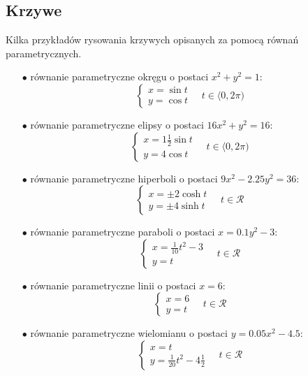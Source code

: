 \documentclass[a4paper,titlepage,12pt]{mwart}
\numberwithin{equation}{section}	%
\numberwithin{table}{section}           %
\numberwithin{figure}{section}          %
\begin{document}
\subsection{Krzywe}
Kilka przykładów rysowania krzywych opisanych za pomocą równań parametrycznych.
\begin{itemize}
\item[$\bullet$] równanie parametryczne okręgu o postaci $x^2+y^2=1$:
\begin{equation*} 
\begin{cases}
x=\sin t \\
y=\cos t 
\end{cases}
\quad t\in \langle 0, 2\pi )
\end{equation*}
\item[$\bullet$] równanie parametryczne elipsy o postaci $16x^2+y^2=16$:
\begin{equation*} 
\begin{cases}
x=1\frac{1}{2}\sin t \\
y=4\cos t 
\end{cases}
\quad t\in \langle 0, 2\pi )
\end{equation*}
\item[$\bullet$] równanie parametryczne hiperboli o postaci $9x^2-2.25y^2=36$:
\begin{equation*}
\begin{cases}
x=\pm2\cosh t \\
y=\pm4\sinh t 
\end{cases}
\quad t\in \mathcal{R}
\end{equation*}
\item[$\bullet$] równanie parametryczne paraboli o postaci $x=0.1y^2-3$:
\begin{equation*}
\begin{cases}
x= \frac{1}{10}t^2-3\\
y= t 
\end{cases}
\quad t\in \mathcal{R}
\end{equation*}
\item[$\bullet$] równanie parametryczne linii o postaci $x=6$:
\begin{equation*}
\begin{cases}
x= 6\\
y= t 
\end{cases}
\quad t\in \mathcal{R}
\end{equation*}
\item[$\bullet$] równanie parametryczne wielomianu o postaci $y=0.05x^2-4.5$:
\begin{equation*}
\begin{cases}
x= t\\
y= \frac{1}{20}t^2-4\frac{1}{2}
\end{cases}
\quad t\in \mathcal{R}
\end{equation*}
\end{itemize}
\end{document}
